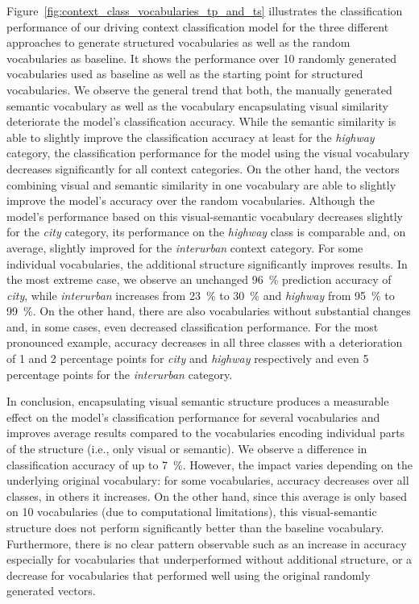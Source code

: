 Figure~\ref{fig:context_class_vocabularies_tp_and_ts} illustrates the classification performance of our driving context classification model for the three different approaches to generate structured vocabularies as well as the random vocabularies as baseline. 
It shows the performance over \num{10} randomly generated vocabularies used as baseline as well as the starting point for structured vocabularies.
We observe the general trend that both, the manually generated semantic vocabulary as well as the vocabulary encapsulating visual similarity deteriorate the model's classification accuracy.
While the semantic similarity is able to slightly improve the classification accuracy at least for the \emph{highway} category, the classification performance for the model using the visual vocabulary decreases significantly for all context categories.
On the other hand, the vectors combining visual and semantic similarity in one vocabulary are able to slightly improve the model's accuracy over the random vocabularies.
Although the model's performance based on this visual-semantic vocabulary decreases slightly for the \emph{city} category, its performance on the \emph{highway} class is comparable and, on average, slightly improved for the \emph{interurban} context category.
For some individual vocabularies, the additional structure significantly improves results.
In the most extreme case, we observe an unchanged \SI{96}{\percent} prediction accuracy of \emph{city}, while \emph{interurban} increases from \SI{23}{\percent} to \SI{30}{\percent} and \emph{highway} from \SI{95}{\percent} to \SI{99}{\percent}. 
On the other hand, there are also vocabularies without substantial changes and, in some cases, even decreased classification performance.
For the most pronounced example, accuracy decreases in all three classes with a deterioration of \num{1} and \num{2} percentage points for \emph{city} and \emph{highway} respectively and even \num{5} percentage points for the \emph{interurban} category.

In conclusion, encapsulating visual semantic structure produces a measurable effect on the model's classification performance for several vocabularies and improves average results compared to the vocabularies encoding individual parts of the structure (i.e., only visual or semantic).
We observe a difference in classification accuracy of up to \SI{7}{\percent}.
However, the impact varies depending on the underlying original vocabulary: for some vocabularies, accuracy decreases over all classes, in others it increases.
On the other hand, since this average is only based on \num{10} vocabularies (due to computational limitations), this visual-semantic structure does not perform significantly better than the baseline vocabulary.
Furthermore, there is no  clear pattern observable such as an increase in accuracy especially for vocabularies that underperformed without additional structure, or a decrease for vocabularies that performed well using the original randomly generated vectors.

